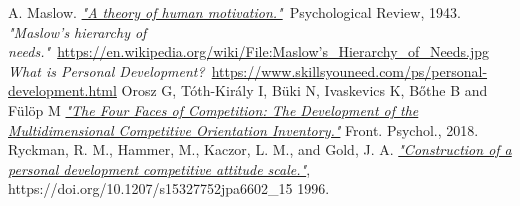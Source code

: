 \documentclass[twoside]{ctuthesis}
\begin{document}
    \maketitle
    
    
    
    
    
    
    

    
    \begin{thebibliography}{99}
         A. Maslow. \href{http://psychclassics.yorku.ca/Maslow/motivation.htm}{\emph{"A theory of human motivation."}}~Psychological Review, 1943.
         \emph{"Maslow's hierarchy of needs."}~\href{https://en.wikipedia.org/wiki/File:Maslow's_Hierarchy_of_Needs.jpg}{https://en.wikipedia.org/wiki/File:Maslow's\_Hierarchy\_of\_Needs.jpg}
         \emph{What is Personal Development?}~\href{https://www.skillsyouneed.com/ps/personal-development.html}{https://www.skillsyouneed.com/ps/personal-development.html}
         Orosz G, Tóth-Király I, Büki N, Ivaskevics K, Bőthe B and Fülöp M \href{https://www.frontiersin.org/articles/10.3389/fpsyg.2018.00779/full}{\emph{"The Four Faces of Competition: The Development of the Multidimensional Competitive Orientation Inventory."}} Front. Psychol., 2018.
         Ryckman, R. M., Hammer, M., Kaczor, L. M., and Gold, J. A. \href{https://doi.org/10.1207/s15327752jpa6602_15}{\emph{"Construction of a personal development competitive attitude scale."}}, https://doi.org/10.1207/s15327752jpa6602\_15 1996.
    \end{thebibliography}
\end{document}
